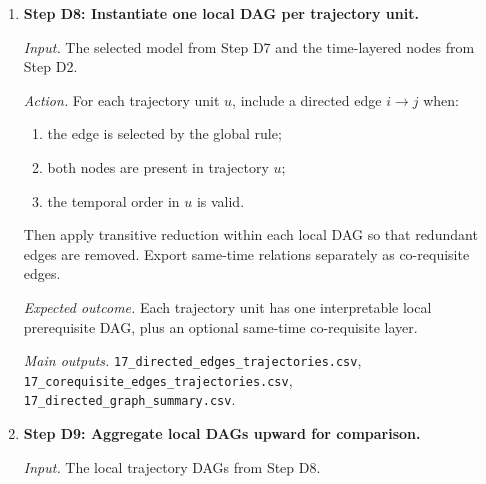 \begin{enumerate}
    \textit{Action.} For each candidate edge-support cutoff $\tau$, evaluate held-out prediction of
    first-introduction events. If semantic representations are being compared, select jointly:
    \[
    (r^*, \tau^*)
    =
    \arg\max_{r,\tau}
    \mathrm{CVSkill}(r,\tau).
    \]
    If no representation comparison is used, select only
    \[
    \tau^*
    =
    \arg\max_{\tau}
    \mathrm{CVSkill}(\tau).
    \]
    If no thresholded graph outperforms the null model, do not force a binary graph; retain the
    weighted directed graph with edge weights $q_{ij}$.

    \textit{Expected outcome.} The representation choice and the cutoff choice are made
    automatically from predictive performance rather than from hand-set topology rules.

    \textit{Main outputs.}
    \texttt{16\_directed\_selection\_surface.csv},
    \texttt{16\_directed\_selected\_model.csv}.

    \item \textbf{Step D8: Instantiate one local DAG per trajectory unit.}

    \textit{Input.} The selected model from Step D7 and the time-layered nodes from Step D2.

    \textit{Action.} For each trajectory unit $u$, include a directed edge $i \rightarrow j$ when:
    \begin{enumerate}
        \item the edge is selected by the global rule;
        \item both nodes are present in trajectory $u$;
        \item the temporal order in $u$ is valid.
    \end{enumerate}
    Then apply transitive reduction within each local DAG so that redundant edges are removed.
    Export same-time relations separately as co-requisite edges.

    \textit{Expected outcome.} Each trajectory unit has one interpretable local prerequisite DAG,
    plus an optional same-time co-requisite layer.

    \textit{Main outputs.}
    \texttt{17\_directed\_edges\_trajectories.csv},
    \texttt{17\_corequisite\_edges\_trajectories.csv},
    \texttt{17\_directed\_graph\_summary.csv}.

    \item \textbf{Step D9: Aggregate local DAGs upward for comparison.}

    \textit{Input.} The local trajectory DAGs from Step D8.


\end{enumerate}
